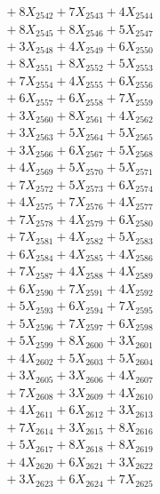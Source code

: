 \documentclass[a4paper,10pt]{article}
\begin{document}
{\begin{align}
&\;  + 8 X_{2542} + 7 X_{2543} + 4 X_{2544} \\[0.3ex]
&\;  + 8 X_{2545} + 8 X_{2546} + 5 X_{2547} \\[0.3ex]
&\;  + 3 X_{2548} + 4 X_{2549} + 6 X_{2550} \\[0.3ex]
&\;  + 8 X_{2551} + 8 X_{2552} + 5 X_{2553} \\[0.3ex]
&\;  + 7 X_{2554} + 4 X_{2555} + 6 X_{2556} \\[0.3ex]
&\;  + 6 X_{2557} + 6 X_{2558} + 7 X_{2559} \\[0.5ex]\allowbreak
&\;  + 3 X_{2560} + 8 X_{2561} + 4 X_{2562} \\[0.3ex]
&\;  + 3 X_{2563} + 5 X_{2564} + 5 X_{2565} \\[0.3ex]
&\;  + 3 X_{2566} + 6 X_{2567} + 5 X_{2568} \\[0.3ex]
&\;  + 4 X_{2569} + 5 X_{2570} + 5 X_{2571} \\[0.3ex]
&\;  + 7 X_{2572} + 5 X_{2573} + 6 X_{2574} \\[0.3ex]
&\;  + 4 X_{2575} + 7 X_{2576} + 4 X_{2577} \\[0.3ex]
&\;  + 7 X_{2578} + 4 X_{2579} + 6 X_{2580} \\[0.3ex]
&\;  + 7 X_{2581} + 4 X_{2582} + 5 X_{2583} \\[0.3ex]
&\;  + 6 X_{2584} + 4 X_{2585} + 4 X_{2586} \\[0.3ex]
&\;  + 7 X_{2587} + 4 X_{2588} + 4 X_{2589} \\[0.5ex]\allowbreak
&\;  + 6 X_{2590} + 7 X_{2591} + 4 X_{2592} \\[0.3ex]
&\;  + 5 X_{2593} + 6 X_{2594} + 7 X_{2595} \\[0.3ex]
&\;  + 5 X_{2596} + 7 X_{2597} + 6 X_{2598} \\[0.3ex]
&\;  + 5 X_{2599} + 8 X_{2600} + 3 X_{2601} \\[0.3ex]
&\;  + 4 X_{2602} + 5 X_{2603} + 5 X_{2604} \\[0.3ex]
&\;  + 3 X_{2605} + 3 X_{2606} + 4 X_{2607} \\[0.3ex]
&\;  + 7 X_{2608} + 3 X_{2609} + 4 X_{2610} \\[0.3ex]
&\;  + 4 X_{2611} + 6 X_{2612} + 3 X_{2613} \\[0.3ex]
&\;  + 7 X_{2614} + 3 X_{2615} + 8 X_{2616} \\[0.3ex]
&\;  + 5 X_{2617} + 8 X_{2618} + 8 X_{2619} \\[0.5ex]\allowbreak
&\;  + 4 X_{2620} + 6 X_{2621} + 3 X_{2622} \\[0.3ex]
&\;  + 3 X_{2623} + 6 X_{2624} + 7 X_{2625} \\[0.3ex]

\end{align}}
\end{document}
